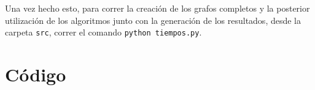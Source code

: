 \documentclass[a4paper,10pt]{article}
\begin{document}
	Una vez hecho esto, para correr la creación de los grafos completos y la posterior utilización de los algoritmos junto con la generación de los resultados, desde la carpeta \texttt{src}, correr el comando \texttt{python tiempos.py}.

\pagebreak

\newpage
\section{Código}
\lstset{
	language=Python, columns=flexible, breaklines=true, frame=single, title=bellman\_ford.py
}


\lstset{ title=creador\_grafos.py }


\lstset{ title=dijkstra.py }


\lstset{ title=floyd\_warshall.py }


\lstset{ title=grafo.py }


\lstset{ title=parser.py }


\lstset{ title=tiempos.py }

\end{document}
